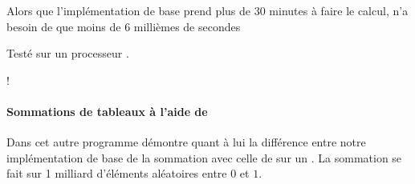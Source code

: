 \documentclass[letterpaper,10pt,french]{sphinxmanual}
\begin{document}
\begin{sphinxVerbatim}[commandchars=\\\{\}]
     
     
\end{sphinxVerbatim}

Alors que l’implémentation de base prend plus de 30 minutes à faire le calcul,  n’a besoin de que moins de 6 millièmes de secondes%
\begin{footnote}[32]\sphinxAtStartFootnote
Testé sur un processeur .
%
\end{footnote}!


\paragraph{Sommations de tableaux à l’aide de }
\label{\detokenize{preprocessing:sommations-de-tableaux-a-laide-de-numpy}}
Dans cet autre programme démontre quant à lui la différence entre notre implémentation de base de la sommation avec celle de  sur un . La sommation se fait sur 1 milliard d’éléments aléatoires entre \(0\) et \(1\).
\end{document}
